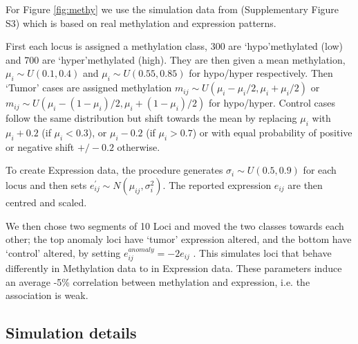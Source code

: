 \documentclass[a4]{article}
\newcommand{\+}[1]{\mathbf{#1}}
\begin{document}
For Figure \ref{fig:methy} we use the simulation data from \cite{gu2016complex} (Supplementary Figure S3) which is based on real methylation and expression patterns.

First each locus is assigned a methylation class, 300 are `hypo'methylated (low) and 700 are `hyper'methylated (high). They are then given a mean methylation, $\mu_i \sim U(0.1,0.4)$ and $\mu_i \sim U(0.55,0.85)$ for hypo/hyper respectively. Then `Tumor' cases are assigned methylation $m_{ij}\sim U(\mu_i-\mu_i/2, \mu_i+\mu_i/2)$ or $m_{ij}\sim U(\mu_i-(1-\mu_i)/2, \mu_i+(1-\mu_i)/2)$ for hypo/hyper. Control cases follow the same distribution but shift towards the mean by replacing $\mu_i$ with $\mu_i+0.2$ (if $\mu_i<0.3$), or $\mu_i-0.2$ (if $\mu_i>0.7$) or with equal probability of positive or negative shift $+/-0.2$ otherwise.

To create Expression data, the procedure generates $\sigma_i \sim U(0.5,0.9)$ for each locus and then sets $e_{ij}^\prime\sim N(\mu_{ij},\sigma_i^2)$. The reported expression $e_{ij}$ are then centred and scaled.

We then chose two segments of 10 Loci and moved the two classes towards each other; the top anomaly loci have `tumor' expression altered, and the bottom have `control' altered, by setting $e_{ij}^{anomaly}=-2e_{ij}$ . This simulates loci that behave differently in Methylation data to in Expression data. These parameters induce an average -5\% correlation between methylation and expression, i.e. the association is weak. 


\subsection{Simulation details}
\label{sec:methodssim}


\end{document}
